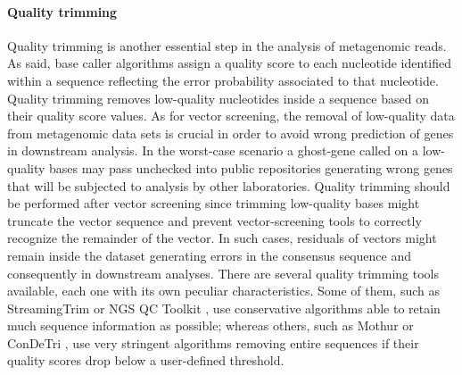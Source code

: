 \paragraph{Quality trimming}
Quality trimming is another essential step in the analysis of metagenomic reads. As said, base caller algorithms assign a quality score to each nucleotide identified within a sequence reflecting the error probability associated to that nucleotide. Quality trimming removes low-quality nucleotides inside a sequence based on their quality score values. As for vector screening, the removal of low-quality data from metagenomic data sets is crucial in order to avoid wrong prediction of genes in downstream analysis. In the worst-case scenario a ghost-gene called on a low-quality bases may pass unchecked into public repositories generating wrong genes that will be subjected to analysis by other laboratories. Quality trimming should be performed after vector screening since trimming low-quality bases might truncate the vector sequence and prevent vector-screening tools to correctly recognize the remainder of the vector. In such cases, residuals of vectors might remain inside the dataset generating errors in the consensus sequence and consequently in downstream analyses. There are several quality trimming tools available, each one with its own peculiar characteristics. Some of them, such as StreamingTrim \cite{bacci2014streamingtrim} or NGS QC Toolkit \cite{patel2012ngs}, use conservative algorithms able to retain much sequence information as possible; whereas others, such as Mothur \cite{schloss2009introducing} or ConDeTri \cite{smeds2011condetri}, use very stringent algorithms removing entire sequences if their quality scores drop below a user-defined threshold.\\%

